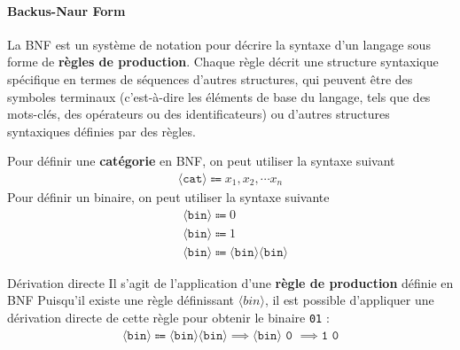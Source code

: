 \documentclass{report}
\begin{document}
\begin{multicols*}{3}
    \paragraph{Backus-Naur Form}
    La BNF est un système de notation pour décrire la syntaxe d'un langage sous
    forme de \textbf{règles de production}. Chaque règle décrit une structure
    syntaxique spécifique en termes de séquences d'autres structures, qui
    peuvent être des symboles terminaux (c'est-à-dire les éléments de base du
    langage, tels que des mots-clés, des opérateurs ou des identificateurs) ou
    d'autres structures syntaxiques définies par des règles.

    \begin{EExample}{}{}
        Pour définir une \textbf{catégorie} en BNF, on peut utiliser la syntaxe suivant 
        \begin{align*}
            \langle \texttt{cat} \rangle \Coloneqq x_1, x_2, \cdots x_n
        \end{align*}
        Pour définir un binaire, on peut utiliser la syntaxe suivante
        \begin{align*}
             &\langle \texttt{bin} \rangle \Coloneqq 0 \\       
             &\langle \texttt{bin} \rangle \Coloneqq 1 \\
             &\langle \texttt{bin} \rangle \Coloneqq \langle \texttt{bin}  \rangle \langle \texttt{bin} \rangle
        \end{align*}
    \end{EExample}




    \begin{Definitionx}{Dérivation directe}{}
        Il s'agit de l'application d'une \textbf{règle de production} définie en
        BNF  Puisqu'il existe une règle définissant $\langle bin \rangle$, il
        est possible d'appliquer une dérivation directe de cette règle pour
        obtenir le binaire \texttt{01} :
        \begin{align*}
            \langle \texttt{bin}   \rangle \Coloneqq \langle \texttt{bin} \rangle \langle \texttt{bin} \rangle 
            \implies \langle \texttt{bin} \rangle \texttt{ 0 } \implies \texttt{1 0}  
        \end{align*}
    \end{Definitionx}


\end{multicols*}
\end{document}
